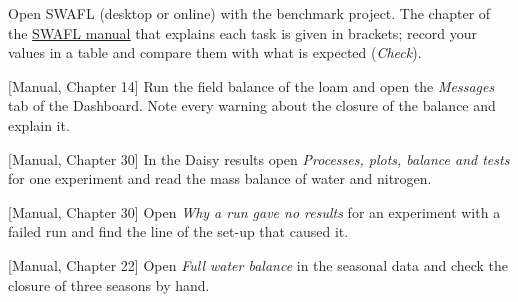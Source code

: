 {\small Open SWAFL (desktop or online) with the benchmark project. The chapter of the \href{https://github.com/halilunaziru73-creator/Coupled-Water-Fluxes-Pore-Scale-Dynamics-Precision-Irrigation-Mulching-Feedback-Loops/raw/main/Software/v1.1.0/SWAFL_Desktop/docs/manual_v1.1.0/SWAFL_Manual_v1.1.0.pdf}{SWAFL manual} that explains each task is given in brackets; record your values in a table and compare them with what is expected (\emph{Check}).}\par\vspace{3pt}
\begin{exlist}
\item {\color{khblue}[Manual, Chapter 14]} Run the field balance of the loam and open the \emph{Messages} tab of the Dashboard. Note every warning about the closure of the balance and explain it.\par{}
\item {\color{khblue}[Manual, Chapter 30]} In the Daisy results open \emph{Processes, plots, balance and tests} for one experiment and read the mass balance of water and nitrogen.\par{}
\item {\color{khblue}[Manual, Chapter 30]} Open \emph{Why a run gave no results} for an experiment with a failed run and find the line of the set-up that caused it.\par{}
\item {\color{khblue}[Manual, Chapter 22]} Open \emph{Full water balance} in the seasonal data and check the closure of three seasons by hand.\par{}
\end{exlist}
